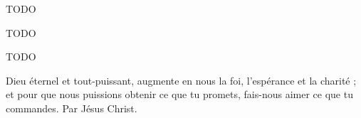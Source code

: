 

TODO


TODO


TODO

Dieu éternel et tout-puissant,
augmente en nous la foi,
l’espérance et la charité ; et pour
que nous puissions obtenir ce
que tu promets, fais-nous aimer
ce que tu commandes. Par Jésus
Christ.